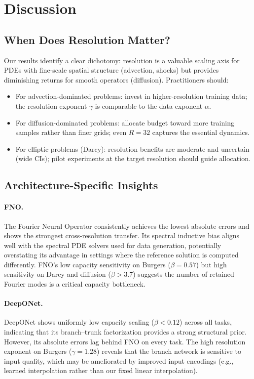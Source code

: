 \documentclass[11pt]{article}
\begin{document}
\section{Discussion}
\label{sec:discussion}

\subsection{When Does Resolution Matter?}

Our results identify a clear dichotomy: resolution is a valuable scaling
axis for PDEs with fine-scale spatial structure (advection, shocks) but
provides diminishing returns for smooth operators (diffusion).
Practitioners should:
\begin{itemize}
  \item For advection-dominated problems: invest in higher-resolution
    training data; the resolution exponent $\gamma$ is comparable
    to the data exponent $\alpha$.
  \item For diffusion-dominated problems: allocate budget toward more
    training samples rather than finer grids; even $R = 32$ captures
    the essential dynamics.
  \item For elliptic problems (Darcy): resolution benefits are
    moderate and uncertain (wide CIs); pilot experiments at the target
    resolution should guide allocation.
\end{itemize}

\subsection{Architecture-Specific Insights}

\paragraph{FNO.}
The Fourier Neural Operator consistently achieves the lowest absolute
errors and shows the strongest cross-resolution transfer. Its spectral
inductive bias aligns well with the spectral PDE solvers used for data
generation, potentially overstating its advantage in settings where the
reference solution is computed differently. FNO's low capacity
sensitivity on Burgers ($\beta = 0.57$) but high sensitivity on Darcy
and diffusion ($\beta > 3.7$) suggests the number of retained Fourier
modes is a critical capacity bottleneck.

\paragraph{DeepONet.}
DeepONet shows uniformly low capacity scaling ($\beta < 0.12$) across
all tasks, indicating that its branch--trunk factorization provides a
strong structural prior. However, its absolute errors lag behind FNO on
every task. The high resolution exponent on Burgers ($\gamma = 1.28$)
reveals that the branch network is sensitive to input quality, which may
be ameliorated by improved input encodings (e.g., learned interpolation
rather than our fixed linear interpolation).
\end{document}
